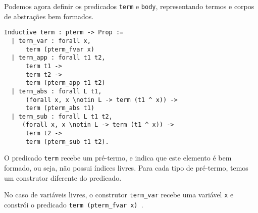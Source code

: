 Podemos agora definir os predicados \texttt{term} e \texttt{body}, representando
termos e corpos de abstrações bem formados.

\begin{lstlisting}[basicstyle=\small]
Inductive term : pterm -> Prop :=
  | term_var : forall x,
      term (pterm_fvar x)
  | term_app : forall t1 t2,
      term t1 -> 
      term t2 -> 
      term (pterm_app t1 t2)
  | term_abs : forall L t1,
      (forall x, x \notin L -> term (t1 ^ x)) ->
      term (pterm_abs t1)
  | term_sub : forall L t1 t2,
     (forall x, x \notin L -> term (t1 ^ x)) ->
      term t2 -> 
      term (pterm_sub t1 t2).
\end{lstlisting}

O predicado \texttt{term} recebe um pré-termo, e indica que este elemento é bem
formado, ou seja, não possui índices livres. Para cada tipo de pré-termo, temos
um construtor diferente do predicado.

No caso de variáveis livres, o construtor \texttt{term\_var} recebe uma variável
\texttt{x} e constrói o predicado \texttt{term (pterm\_fvar x) }.

